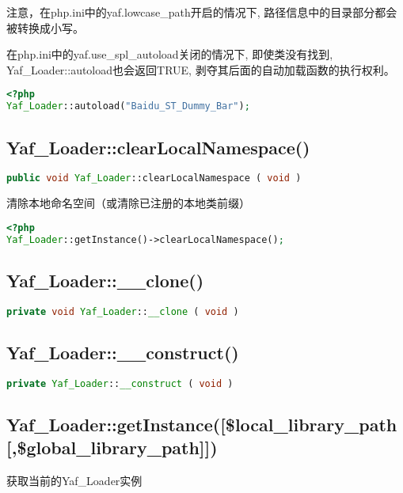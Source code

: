 注意，在php.ini中的yaf.lowcase\_path开启的情况下, 路径信息中的目录部分都会被转换成小写。

在php.ini中的yaf.use\_spl\_autoload关闭的情况下, 即使类没有找到, Yaf\_Loader::autoload也会返回TRUE, 剥夺其后面的自动加载函数的执行权利。

\begin{lstlisting}[language=PHP]
<?php
Yaf_Loader::autoload("Baidu_ST_Dummy_Bar");
\end{lstlisting}

\subsection{Yaf\_Loader::clearLocalNamespace()}



\begin{lstlisting}[language=PHP]
public void Yaf_Loader::clearLocalNamespace ( void )
\end{lstlisting}


清除本地命名空间（或清除已注册的本地类前缀）

\begin{lstlisting}[language=PHP]
<?php
Yaf_Loader::getInstance()->clearLocalNamespace();
\end{lstlisting}

\subsection{Yaf\_Loader::\_\_clone()}



\begin{lstlisting}[language=PHP]
private void Yaf_Loader::__clone ( void )
\end{lstlisting}

\subsection{Yaf\_Loader::\_\_construct()}

\begin{lstlisting}[language=PHP]
private Yaf_Loader::__construct ( void )
\end{lstlisting}

\subsection{Yaf\_Loader::getInstance([\$local\_library\_path [,\$global\_library\_path]])}

获取当前的Yaf\_Loader实例

